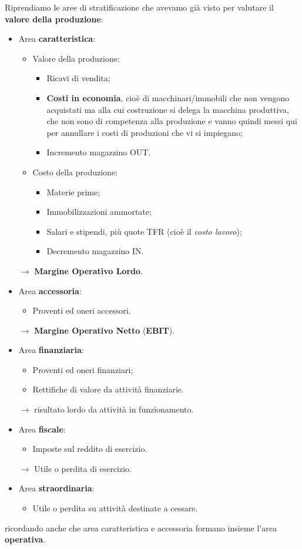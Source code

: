 \documentclass[a4paper,11pt]{article}
\begin{document}
Riprendiamo le aree di stratificazione che avevamo già visto per valutare il \textbf{valore della produzione}:
\begin{itemize}
	\item Area \textbf{caratteristica}:
		\begin{itemize}
			\item Valore della produzione:
				\begin{itemize}
					\item Ricavi di vendita;
					\item \textbf{Costi in economia}, cioè di macchinari/immobili che non vengono acquistati ma alla cui costruzione si delega la macchina produttiva, che non sono di competenza alla produzione e vanno quindi messi qui per annullare i costi di produzioni che vi si impiegano;
					\item Incremento magazzino OUT.
				\end{itemize}
			\item Costo della produzione:
				\begin{itemize}
					\item Materie prime;
					\item Immobilizzazioni ammortate;
					\item Salari e stipendi, più quote TFR (cioè il \textit{costo lavoro});
					\item Decremento magazzino IN.
				\end{itemize}
		\end{itemize}
		$\rightarrow$ \textbf{Margine Operativo Lordo}.
	\item Area \textbf{accessoria}:
		\begin{itemize}
			\item Proventi ed oneri accessori.
		\end{itemize}
		$\rightarrow$ \textbf{Margine Operativo Netto} (\textbf{EBIT}).
	\item Area \textbf{finanziaria}:
		\begin{itemize}
			\item Proventi ed oneri finanziari;
			\item Rettifiche di valore da attività finanziarie.
		\end{itemize}
		$\rightarrow$ risultato lordo da attività in funzionamento.
	\item Area \textbf{fiscale}:
		\begin{itemize}
			\item Imposte sul reddito di esercizio.
		\end{itemize}
		$\rightarrow$ Utile o perdita di esercizio.
	\item Area \textbf{straordinaria}:
		\begin{itemize}
			\item Utile o perdita su attività destinate a cessare.
		\end{itemize}
\end{itemize}
ricordando anche che area caratteristica e accessoria formano insieme l'area \textbf{operativa}.
\end{document}
